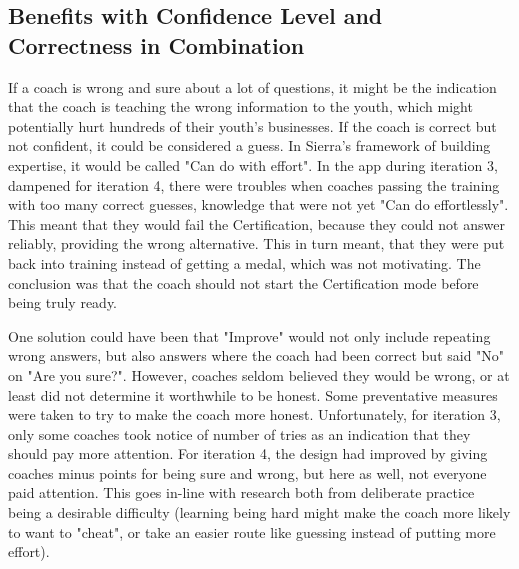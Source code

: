 



  \subsection{Benefits with Confidence Level and Correctness in Combination}
  If a coach is wrong and sure about a lot of questions, it might be the indication that the coach is teaching the wrong information to the youth, which might potentially hurt hundreds of their youth's businesses. If the coach is correct but not confident, it could be considered a guess. In Sierra's framework of building expertise, it would be called "Can do with effort". In the app during iteration 3, dampened for iteration 4, there were troubles when coaches passing the training with too many correct guesses, knowledge that were not yet "Can do effortlessly". This meant that they would fail the Certification, because they could not answer reliably, providing the wrong alternative. This in turn meant, that they were put back into training instead of getting a medal, which was not motivating. The conclusion was that the coach should not start the Certification mode before being truly ready.

  One solution could have been that "Improve" would not only include repeating wrong answers, but also answers where the coach had been correct but said "No" on "Are you sure?". However, coaches seldom believed they would be wrong, or at least did not determine it worthwhile to be honest. Some preventative measures were taken to try to make the coach more honest. Unfortunately, for iteration 3, only some coaches took notice of number of tries as an indication that they should pay more attention. For iteration 4, the design had improved by giving coaches minus points for being sure and wrong, but here as well, not everyone paid attention. This goes in-line with research both from deliberate practice being a desirable difficulty (learning being hard might make the coach more likely to want to "cheat", or take an easier route like guessing instead of putting more effort).

